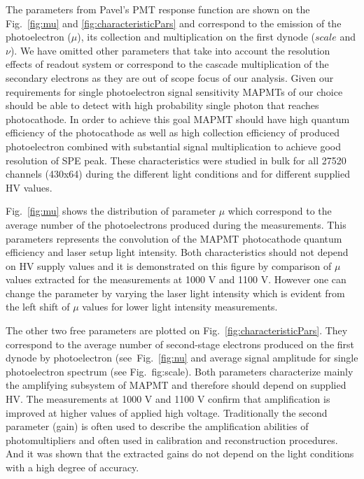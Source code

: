The parameters from Pavel's PMT response function are shown on the Fig.~\ref{fig:mu} and \ref{fig:characteristicPars} and correspond to the emission of the photoelectron ($\mu$), its collection and multiplication on the first dynode ($scale$ and $\nu$).
We have omitted other parameters that take into account the resolution effects of readout system or correspond to the cascade multiplication of the secondary electrons as they are out of scope focus of our analysis.
Given our requirements for single photoelectron signal sensitivity MAPMTs of our choice should be able to detect with high probability single photon that reaches photocathode.
In order to achieve this goal MAPMT should have high quantum efficiency of the photocathode as well as high collection efficiency of produced photoelectron combined with substantial signal multiplication to achieve good resolution of SPE peak.
These characteristics were studied in bulk for all 27520 channels (430x64) during the different light conditions and for different supplied HV values.


Fig.~\ref{fig:mu} shows the distribution of parameter $\mu$ which correspond to the average number of the photoelectrons produced during the measurements.
This parameters represents the convolution of the MAPMT photocathode quantum efficiency and laser setup light intensity.
Both characteristics should not depend on HV supply values and it is demonstrated on this figure by comparison of $\mu$ values extracted for the measurements at 1000 V and 1100 V.
However one can change the parameter by varying the laser light intensity which is evident from the left shift of $\mu$ values for lower light intensity measurements.

The other two free parameters are plotted on Fig.~\ref{fig:characteristicPars}.
They correspond to the average number of second-stage electrons produced on the first dynode by photoelectron (see~Fig.~\ref{fig:nu} and average signal amplitude for single photoelectron spectrum (see Fig.~{fig:scale}).
Both parameters characterize mainly the amplifying subsystem of MAPMT and therefore should depend on supplied HV.
The measurements at 1000 V and 1100 V confirm that amplification is improved at higher values of applied high voltage.
Traditionally the second parameter (gain) is often used to describe the amplification abilities of photomultipliers and often used in calibration and reconstruction procedures.
And it was shown that the extracted gains do not depend on the light conditions with a high degree of accuracy.

